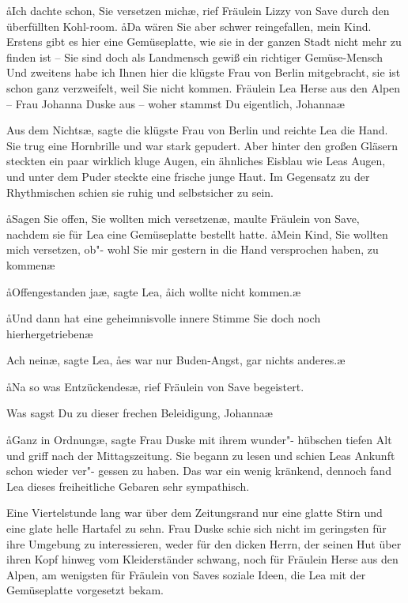 \aa{}Ich dachte schon, Sie versetzen mich\ae{}, rief Fräulein Lizzy
von Save durch den überfüllten Kohl-room. \aa{}Da wären Sie
aber schwer reingefallen, mein Kind. Erstens gibt es hier eine
Gemüseplatte, wie sie in der ganzen Stadt nicht mehr zu
finden ist -- Sie sind doch als Landmensch gewiß ein richtiger
Gemüse-Mensch\frag{} Und zweitens habe ich Ihnen hier die klügste
Frau von Berlin mitgebracht, sie ist schon ganz verzweifelt,
weil Sie nicht kommen. Fräulein Lea Herse aus den Alpen --
Frau Johanna Duske aus -- woher stammst Du eigentlich,
Johanna\frag{}\ae{}

\aanah{}Aus dem Nichts\ae{}, sagte die klügste Frau von Berlin und
reichte Lea die Hand. Sie trug eine Hornbrille und war stark
gepudert. Aber hinter den großen Gläsern steckten ein paar
wirklich kluge Augen, ein ähnliches Eisblau wie Leas Augen,
und unter dem Puder steckte eine frische junge Haut. Im
Gegensatz zu der Rhythmischen schien sie ruhig und selbstsicher
zu sein.

\aa{}Sagen Sie offen, Sie wollten mich versetzen\frag{}\ae{}, maulte
Fräulein von Save, nachdem sie für Lea eine Gemüseplatte
bestellt hatte. \aa{}Mein Kind, Sie wollten mich versetzen, ob"-%
wohl Sie mir gestern in die Hand versprochen haben, zu
kommen\frag{}\ae{}

\aa{}Offengestanden ja\ae{}, sagte Lea, \aa{}ich wollte nicht kommen.\ae{}

\aa{}Und dann hat eine geheimnisvolle innere Stimme Sie doch
noch hierhergetrieben\frag{}\ae{}

\aanah{}Ach nein\ae{}, sagte Lea, \aa{}es war nur Buden-Angst, gar nichts
anderes.\ae{}

\aa{}Na so was Entzückendes\ae{}, rief Fräulein von Save begeistert.

\aanah{}Was sagst Du zu dieser frechen Beleidigung, Johanna\frag{}\ae{}

\aa{}Ganz in Ordnung\ae{}, sagte Frau Duske mit ihrem wunder"-%
hübschen tiefen Alt und griff nach der Mittagszeitung. Sie
begann zu lesen und schien Leas Ankunft schon wieder ver"-%
gessen zu haben. Das war ein wenig kränkend, dennoch fand
Lea dieses freiheitliche Gebaren sehr sympathisch.

Eine Viertelstunde lang war über dem Zeitungsrand nur eine
glatte Stirn und eine glate helle Hartafel zu sehn. Frau
Duske schie sich nicht im geringsten für ihre Umgebung zu
interessieren, weder für den dicken Herrn, der seinen Hut
über ihren Kopf hinweg vom Kleiderständer schwang, noch
für Fräulein Herse aus den Alpen, am wenigsten für Fräulein
von Saves soziale Ideen, die Lea mit der Gemüseplatte
vorgesetzt bekam.

